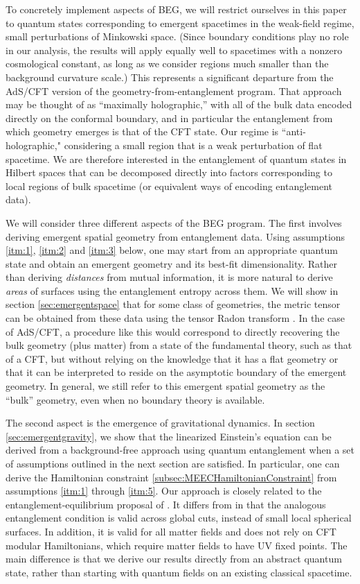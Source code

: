 \documentclass[%
preprint,
nofootinbib,
amsmath,amssymb,
aps,
prd,
showpacs,
superscriptaddress
]{revtex4-1}
\begin{document}
To concretely implement aspects of BEG, we will restrict ourselves in this paper to quantum states corresponding to emergent spacetimes in the weak-field regime, small perturbations of Minkowski space.
(Since boundary conditions play no role in our analysis, the results will apply equally well to spacetimes with a nonzero cosmological constant, as long as we consider regions much smaller than the background curvature scale.)
This represents a significant departure from the AdS/CFT version of the geometry-from-entanglement program. 
That approach may be thought of as ``maximally holographic,'' with all of the bulk data encoded directly on the conformal boundary, and in particular the entanglement from which geometry emerges is that of the CFT state.
Our regime is ``anti-holographic," considering a small region that is a weak perturbation of flat spacetime.
We are therefore interested in the entanglement of quantum states in Hilbert spaces that can be decomposed directly into factors corresponding to local regions of bulk spacetime (or equivalent ways of encoding entanglement data).

We will consider three different aspects of the BEG program. 
The first involves deriving emergent spatial geometry from entanglement data.
Using assumptions \ref{itm:1}, \ref{itm:2} and \ref{itm:3} below, one may start from an appropriate quantum state and obtain an emergent geometry and its best-fit dimensionality. 
Rather than deriving \emph{distances} from mutual information, it is more natural to derive \emph{areas} of surfaces using the entanglement entropy across them.
We will show in section \ref{sec:emergentspace} that for some class of geometries, the metric tensor can be obtained from these data using the tensor Radon transform \cite{sharafutdinov1994integral}. In the case of AdS/CFT, a procedure like this would correspond to directly recovering the bulk geometry (plus matter) from a state of the fundamental theory, such as that of a CFT, but without relying on the knowledge that it has a flat geometry or that it can be interpreted to reside on the asymptotic boundary of the emergent geometry. In general, we still refer to this emergent spatial geometry as the ``bulk'' geometry, even when no boundary theory is available. 

The second aspect is the emergence of gravitational dynamics.
In section \ref{sec:emergentgravity}, we show that the linearized Einstein's equation can be derived from a background-free approach using quantum entanglement when a set of assumptions outlined in the next section are satisfied. 
In particular, one can derive the Hamiltonian constraint \ref{subsec:MEECHamiltonianConstraint} from assumptions \ref{itm:1} through \ref{itm:5}. 
Our approach is closely related to the entanglement-equilibrium proposal of \cite{Jacobson:2015hqa}. It differs from \cite{Jacobson:2015hqa} in that the analogous entanglement condition is valid across global cuts, instead of small local spherical surfaces. In addition, it is valid for all matter fields and does not rely on CFT modular Hamiltonians, which require matter fields to have UV fixed points.
The main difference is that we derive our results directly from an abstract quantum state, rather than starting with quantum fields on an existing classical spacetime. 
\end{document}
